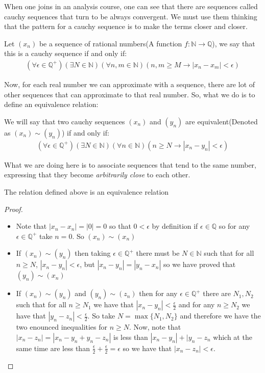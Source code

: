 \documentclass{tufte-handout}
\begin{document}
When one joins in an analysis course, one can see that there are sequences called cauchy sequences that turn to be always convergent. We must use them thinking that the pattern for a cauchy sequence is to make the terms closer and closer.

\begin{definition}
	Let $(x_n)$ be a sequence of rational numbers(A function $f: \mathbb{N} \to \mathbb{Q}$), we say that this is a cauchy sequence if and only if:
	\begin{align*}
		(\forall \epsilon \in \mathbb{Q}^+)(\exists N \in \mathbb{N})(\forall n, m  \in \mathbb{N})(n, m \ge M \rightarrow |x_n - x_m| < \epsilon)
	\end{align*}
\end{definition}

Now, for each real number we can approximate with a sequence, there are lot of other sequences that can approximate to that real number. So, what we do is to define an equivalence relation:

\begin{definition}
	We will say that two cauchy sequences $(x_n)$ and $(y_n)$ are equivalent(Denoted as $(x_n) \sim (y_n)$) if and only if:
	\begin{align*}
		(\forall \epsilon \in \mathbb{Q}^+) (\exists N \in \mathbb{N}) (\forall n \in \mathbb{N})(n \ge N \rightarrow |x_n - y_n| < \epsilon)
	\end{align*}
\end{definition}

What we are doing here is to associate sequences that tend to the same number, expressing that they become \textit{arbitrarily close} to each other.

\begin{theorem}
	The relation defined above is an equivalence relation
\end{theorem}
\begin{proof}
	\begin{itemize}
		\item Note that $|x_n - x_n| = |0| = 0$ so that $0 < \epsilon$ by definition if $\epsilon \in \mathbb{Q}$ so for any $\epsilon \in \mathbb{Q}^+$ take $n = 0$. So $(x_n) \sim (x_n)$
		\item If $(x_n) \sim (y_n)$ then taking $\epsilon \in \mathbb{Q}^+$ there must be $N \in \mathbb{N}$ such that for all $n \ge N$, $|x_n - y_n| < \epsilon$, but $|x_n - y_n| = |y_n - x_n|$ so we have proved that $(y_n) \sim (x_n)$
		\item If $(x_n) \sim (y_n)$ and $(y_n) \sim (z_n)$ then for any $\epsilon \in \mathbb{Q}^+$ there are $N_1, N_2$ such that for all $n \ge N_1$ we have that $|x_n - y_n| < \frac{\epsilon}{2}$ and for any $n \ge N_2$ we have that $|y_n - z_n| < \frac{\epsilon}{2}$. So take $N = \max\{N_1, N_2\}$ and therefore we have the two enounced inequalities for $n \ge N$. Now, note that $|x_n - z_n| = |x_n - y_n + y_n - z_n|$ is less than $|x_n - y_n| + |y_n - z_n$ which at the same time are less than $\frac{\epsilon}{2} + \frac{\epsilon}{2} = \epsilon$ so we have that $|x_n - z_n| < \epsilon$.
	\end{itemize}
\end{proof}
\end{document}
